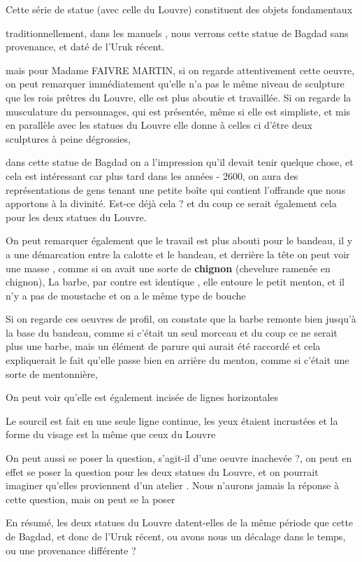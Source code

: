 \documentclass[a4paper,10pt]{article}
\begin{document}
Cette série de statue (avec celle du Louvre) constituent des objets
fondamentaux

traditionnellement, dans les manuels , nous verrons cette statue de
Bagdad sans provenance, et daté de l'Uruk récent.

mais pour Madame FAIVRE MARTIN, si on regarde attentivement cette
oeuvre, on peut remarquer immédiatement qu'elle
n'a pas le même niveau de sculpture que les rois
prêtres du Louvre, elle est plus aboutie et travaillée. Si on regarde
la musculature du personnages, qui est présentée, même si elle est
simpliste, et mis en parallèle avec les statues du Louvre elle donne à
celles ci d'être deux sculptures à peine dégrossies,  

dans cette statue de Bagdad on a l'impression
qu'il devait tenir quelque chose, et cela est
intéressant car plus tard dans les années - 2600, on aura des
représentations de gens tenant une petite boîte qui contient
l'offrande que nous apportons à la divinité. Est-ce
déjà cela ? et du coup ce serait également cela pour les deux statues
du Louvre.

On peut remarquer également que le travail est plus abouti pour le
bandeau, il y a une démarcation entre la calotte et le bandeau, et
derrière la tête on peut voir une masse , comme si on avait une sorte
de \textbf{chignon }(chevelure ramenée en chignon),  La barbe, par
contre est identique , elle entoure le petit menton, et il
n'y a pas de moustache et on a le même type de bouche

Si on regarde ces oeuvres de profil, on constate que la barbe remonte
bien jusqu'à la base du bandeau, comme si
c'était un seul morceau et du coup ce ne serait plus
une barbe, mais un élément de parure qui aurait été raccordé et cela
expliquerait le fait qu'elle passe bien en arrière du
menton, comme si c'était une sorte de mentonnière,

On peut voir qu'elle est également incisée de lignes
horizontales

Le sourcil est fait en une seule ligne continue, les yeux étaient
incrustées et la forme du visage est la même que ceux du Louvre

On peut aussi se poser la question, s'agit-il
d'une oeuvre inachevée ?, on peut en effet se poser la
question pour les deux statues du Louvre, et on pourrait imaginer
qu'elles proviennent d'un atelier .
Nous n'aurons jamais la réponse à cette question, mais
on peut se la poser

En résumé, les deux statues du Louvre datent-elles de la même période
que cette de Bagdad, et donc de l'Uruk récent, ou
avons nous un décalage dans le temps, ou une provenance différente ?
\end{document}
